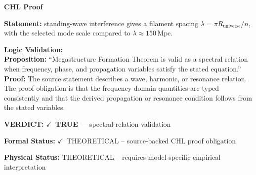 \vspace{0.45em}
\noindent\textbf{CHL Proof}\par
\textbf{Statement:} standing-wave interference gives a filament spacing
\(\lambda=\pi R_{\mathrm{universe}}/n\), with the selected mode scale compared to \(\lambda\approx150\,\mathrm{Mpc}\).

\textbf{Logic Validation:}\\
\textbf{Proposition:} ``Megastructure Formation Theorem is valid as a spectral relation when frequency, phase,
and propagation variables satisfy the stated equation.''\\
\textbf{Proof:} The source statement describes a wave, harmonic, or resonance relation. The proof
obligation is that the frequency-domain quantities are typed consistently and that the
derived propagation or resonance condition follows from the stated variables.

\textbf{VERDICT:} \ensuremath{\checkmark}\ \textbf{TRUE} --- spectral-relation validation

\textbf{Formal Status:} \ensuremath{\checkmark}\ THEORETICAL -- source-backed CHL proof obligation

\textbf{Physical Status:} THEORETICAL -- requires model-specific empirical interpretation
\par\vspace{0.45em}
\par
\ifTZPDarkEdition
{}
\fi
\endgroup
\endgroup
